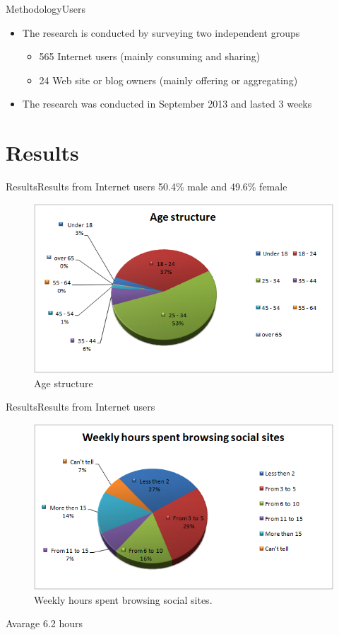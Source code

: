 \begin{frame}{Methodology}{Users}
    \begin{itemize}
      \item The research is conducted by surveying two independent
groups
    \begin{itemize}
        \item 565 Internet users (mainly consuming and sharing) 
        \item 24 Web site or blog owners (mainly offering or aggregating)
    \end{itemize}
        \item The research was conducted in September 2013 and lasted
3 weeks
    \end{itemize}
\end{frame}

\section{Results}

\begin{frame}{Results}{Results from Internet users}
      50.4\% male and 49.6\% female
      \begin{figure}
    \centering
        \includegraphics[width=.7\textwidth]{images/viral/age_structure}
        \caption{Age structure}
        \label{fig:age_structure}
    \end{figure}
\end{frame}

\begin{frame}{Results}{Results from Internet users}
      \begin{figure}
    \centering
        \includegraphics[width=.7\textwidth]{images/viral/weekly_hours}
        \caption{Weekly hours spent browsing social sites.}
        \label{fig:weekly_hours}
    \end{figure}
    Avarage 6.2 hours
\end{frame}

